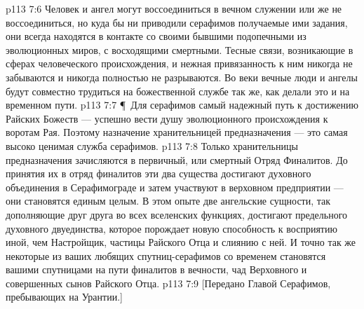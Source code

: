 \vs p113 7:6 Человек и ангел могут воссоединиться в вечном служении или же не воссоединиться, но куда бы ни приводили серафимов получаемые ими задания, они всегда находятся в контакте со своими бывшими подопечными из эволюционных миров, с восходящими смертными. Тесные связи, возникающие в сферах человеческого происхождения, и нежная привязанность к ним никогда не забываются и никогда полностью не разрываются. Во веки вечные люди и ангелы будут совместно трудиться на божественной службе так же, как делали это и на временном пути.
\vs p113 7:7 \P\ Для серафимов самый надежный путь к достижению Райских Божеств --- успешно вести душу эволюционного происхождения к воротам Рая. Поэтому назначение хранительницей предназначения --- это самая высоко ценимая служба серафимов.
\vs p113 7:8 Только хранительницы предназначения зачисляются в первичный, или смертный Отряд Финалитов. До принятия их в отряд финалитов эти два существа достигают духовного объединения в Серафимограде и затем участвуют в верховном предприятии --- они становятся единым целым. В этом опыте две ангельские сущности, так дополняющие друг друга во всех вселенских функциях, достигают предельного духовного двуединства, которое порождает новую способность к восприятию иной, чем Настройщик, частицы Райского Отца и слиянию с ней. И точно так же некоторые из ваших любящих спутниц\hyp{}серафимов со временем становятся вашими спутницами на пути финалитов в вечности, чад Верховного и совершенных сынов Райского Отца.
\vs p113 7:9 [Передано Главой Серафимов, пребывающих на Урантии.]

